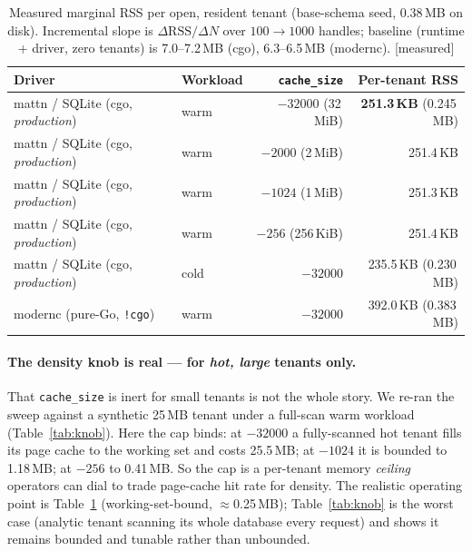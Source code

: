 \documentclass[11pt]{article}
\newcommand{\meas}{\textcolor{blue!60!black}{\small[measured]}}
\begin{document}
\begin{table}[h]
\centering
\caption{Measured marginal RSS per open, resident tenant (base-schema seed, 0.38\,MB on disk).
Incremental slope is $\Delta\text{RSS}/\Delta N$ over $100\rightarrow1000$ handles; baseline
(runtime + driver, zero tenants) is 7.0--7.2\,MB (cgo), 6.3--6.5\,MB (modernc). \meas{}}
\label{tab:perdb}
\begin{tabular}{llrr}
\toprule
Driver & Workload & \texttt{cache\_size} & Per-tenant RSS \\
\midrule
mattn / SQLite (cgo, \emph{production}) & warm & $-32000$ (32\,MiB) & \textbf{251.3\,KB} (0.245\,MB) \\
mattn / SQLite (cgo, \emph{production}) & warm & $-2000$ (2\,MiB)   & 251.4\,KB \\
mattn / SQLite (cgo, \emph{production}) & warm & $-1024$ (1\,MiB)   & 251.3\,KB \\
mattn / SQLite (cgo, \emph{production}) & warm & $-256$ (256\,KiB)  & 251.4\,KB \\
mattn / SQLite (cgo, \emph{production}) & cold & $-32000$           & 235.5\,KB (0.230\,MB) \\
modernc (pure-Go, \texttt{!cgo})        & warm & $-32000$           & 392.0\,KB (0.383\,MB) \\
\bottomrule
\end{tabular}
\end{table}

\paragraph{The density knob is real --- for \emph{hot, large} tenants only.}
That \texttt{cache\_size} is inert for small tenants is not the whole story. We re-ran the sweep
against a synthetic 25\,MB tenant under a full-scan warm workload (Table~\ref{tab:knob}). Here the
cap binds: at $-32000$ a fully-scanned hot tenant fills its page cache to the working set and
costs 25.5\,MB; at $-1024$ it is bounded to 1.18\,MB; at $-256$ to 0.41\,MB. So the cap is a
per-tenant memory \emph{ceiling} operators can dial to trade page-cache hit rate for density.
The realistic operating point is Table~\ref{tab:perdb} (working-set-bound, $\approx$0.25\,MB);
Table~\ref{tab:knob} is the worst case (analytic tenant scanning its whole database every
request) and shows it remains bounded and tunable rather than unbounded.
\end{document}
